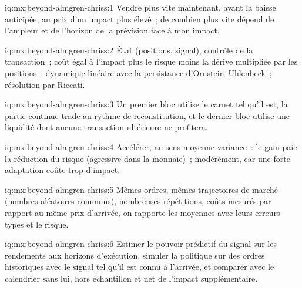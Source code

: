 \begin{solution}{iq:mx:beyond-almgren-chriss:1}
Vendre plus vite maintenant, avant la baisse anticipée, au prix d'un impact plus élevé~; de combien plus vite dépend de l'ampleur et de l'horizon de la prévision face à mon impact.
\end{solution}

\begin{solution}{iq:mx:beyond-almgren-chriss:2}
État (positions, signal), contrôle de la transaction~; coût égal à l'impact plus le risque moins la dérive multipliée par les positions~; dynamique linéaire avec la persistance d'Ornstein--Uhlenbeck~; résolution par Riccati.
\end{solution}

\begin{solution}{iq:mx:beyond-almgren-chriss:3}
Un premier bloc utilise le carnet tel qu'il est, la partie continue trade au rythme de reconstitution, et le dernier bloc utilise une liquidité dont aucune transaction ultérieure ne profitera.
\end{solution}

\begin{solution}{iq:mx:beyond-almgren-chriss:4}
Accélérer, au sens moyenne-variance~: le gain paie la réduction du risque (agressive dans la monnaie)~; modérément, car une forte adaptation coûte trop d'impact.
\end{solution}

\begin{solution}{iq:mx:beyond-almgren-chriss:5}
Mêmes ordres, mêmes trajectoires de marché (nombres aléatoires communs), nombreuses répétitions, coûts mesurés par rapport au même prix d'arrivée, on rapporte les moyennes avec leurs erreurs types et le
risque.
\end{solution}

\begin{solution}{iq:mx:beyond-almgren-chriss:6}
Estimer le pouvoir prédictif du signal sur les rendements aux horizons d'exécution, simuler la politique sur des ordres historiques avec le signal tel qu'il est connu à l'arrivée,
et comparer avec le calendrier sans lui, hors échantillon et net de l'impact supplémentaire.
\end{solution}
